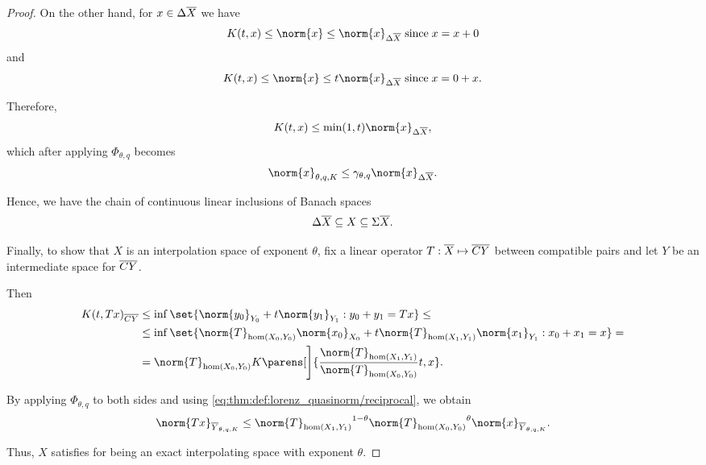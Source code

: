 \begin{proof}
  On the other hand, for \( x \in \Delta \oline{X} \) we have
  \begin{equation*}
    K(t, x) \leq \norm{x} \leq \norm{x}_{\Delta \oline{X}} \T{since} x = x + 0
  \end{equation*}
  and
  \begin{equation*}
    K(t, x) \leq \norm{x} \leq t \norm{x}_{\Delta \oline{X}} \T{since} x = 0 + x.
  \end{equation*}

  Therefore,
  \begin{equation*}
    K(t, x) \leq \min(1, t) \norm{x}_{\Delta \oline{X}},
  \end{equation*}
  which after applying \( \Phi_{\theta,q} \) becomes
  \begin{equation*}
    \norm{x}_{\theta,q,K} \leq \gamma_{\theta,q} \norm{x}_{\Delta \oline{X}}.
  \end{equation*}

  Hence, we have the chain of continuous linear inclusions of Banach spaces
  \begin{equation*}
    \Delta \oline{X} \subseteq X \subseteq \Sigma \oline{X}.
  \end{equation*}

  Finally, to show that \( X \) is an interpolation space of exponent \( \theta \), fix a linear operator \( T: \oline{X} \mapsto \oline{CY} \) between compatible pairs and let \( Y \) be an intermediate space for \( \oline{CY} \).

  Then
  \begin{align*}
    K(t, Tx)_{\oline{CY}}
    &\leq
    \inf \set{ \norm{y_0}_{Y_0} + t \norm{y_1}_{Y_1} : y_0 + y_1 = Tx }
    \leq \\ &\leq
    \inf \set{ \norm{T}_{\hom(X_0, Y_0)} \norm{x_0}_{X_0} + t \norm{T}_{\hom(X_1, Y_1)} \norm{x_1}_{Y_1} : x_0 + x_1 = x }
    = \\ &=
    \norm{T}_{\hom(X_0, Y_0)} K\parens[\Bigg]{\frac {\norm{T}_{\hom(X_1, Y_1)}} {\norm{T}_{\hom(X_0, Y_0)}} t, x}.
  \end{align*}

  By applying \( \Phi_{\theta,q} \) to both sides and using \eqref{eq:thm:def:lorenz_quasinorm/reciprocal}, we obtain
  \begin{equation*}
    \norm{Tx}_{\oline{Y}_{\theta,q,K}}
    \leq
    {\norm{T}_{\hom(X_1, Y_1)}}^{1 - \theta} {\norm{T}_{\hom(X_0, Y_0)}}^{\theta} \norm{x}_{\oline{Y}_{\theta,q,K}}.
  \end{equation*}

  Thus, \( X \) satisfies  for being an exact interpolating space with exponent \( \theta \).
\end{proof}

